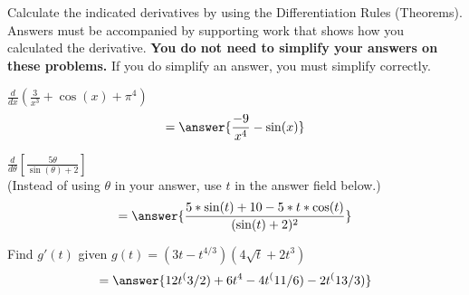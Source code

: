 \documentclass[handout]{ximera}
\begin{document}
\medskip
\begin{problem}
Calculate the indicated derivatives by using the Differentiation Rules (Theorems). Answers must be accompanied by supporting work that shows how you calculated the derivative. \textbf{You do not need to simplify your answers on these problems.} If you do simplify an answer, you must simplify correctly. 

\begin{question}
$\displaystyle \frac{d}{dx}\left(\frac{3}{x^3}+\cos(x)+\pi^4\right)$
\[
= \answer{\dfrac{-9}{x^4} - \sin(x)}
\]

\end{question}

\begin{question}
$\displaystyle \frac{d}{d\theta}\left[\frac{5\theta}{\sin(\theta)+2}\right]$ \\
(Instead of using $\theta$ in your answer, use $t$ in the answer field below.)\\
\[
= \answer{\dfrac{5*\sin(t) + 10 - 5*t*\cos(t)}{(\sin(t) + 2)^2}}
\]
\end{question}


\begin{question}
Find $g'(t)$ given $\displaystyle g(t)=(3t-t^{4/3})(4\sqrt{t}+2t^3)$
\[
= \answer{12t^(3/2) + 6t^4 - 4t^(11/6) - 2t^(13/3)}
\]
\end{question}
\end{problem}
\end{document}
